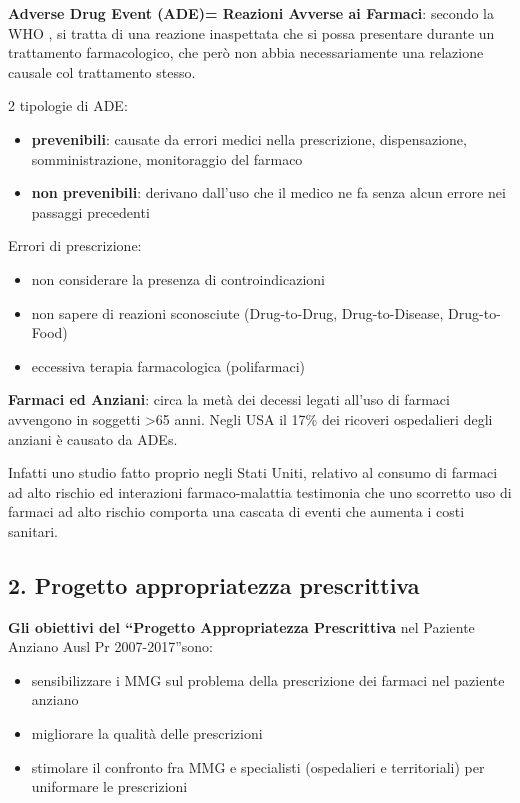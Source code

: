   \textbf{Adverse Drug Event (ADE)= Reazioni Avverse ai Farmaci}:
  secondo la WHO , si tratta di una reazione inaspettata che si possa
  presentare durante un trattamento farmacologico, che però non abbia
  necessariamente una relazione causale col trattamento stesso.

  2 tipologie di ADE:

\begin{itemize}
\item
  \textbf{prevenibili}: causate da errori medici nella prescrizione,
  dispensazione, somministrazione, monitoraggio del farmaco
\item
  \textbf{non prevenibili}: derivano dall'uso che il medico ne fa senza
  alcun errore nei passaggi precedenti
\end{itemize}

  Errori di prescrizione:
  
\begin{itemize}
\item non considerare la presenza di controindicazioni
\item non sapere di reazioni sconosciute (Drug-to-Drug, Drug-to-Disease,
  Drug-to-Food)
\item eccessiva terapia farmacologica (polifarmaci)
\end{itemize}

  \textbf{Farmaci ed Anziani}: circa la metà dei decessi legati all'uso
  di farmaci avvengono in soggetti \textgreater{}65 anni. Negli USA il
  17\% dei ricoveri ospedalieri degli anziani è causato da ADEs.

  Infatti uno studio fatto proprio negli Stati Uniti, relativo al
  consumo di farmaci ad alto rischio ed interazioni farmaco-malattia
  testimonia che uno scorretto uso di farmaci ad alto rischio comporta
  una cascata di eventi che aumenta i costi sanitari.

  \subsection{2. Progetto appropriatezza prescrittiva}
  
  \textbf{Gli obiettivi del ``Progetto Appropriatezza Prescrittiva} nel
  Paziente Anziano Ausl Pr 2007-2017''sono:

\begin{itemize}
\item
  sensibilizzare i MMG sul problema della prescrizione dei farmaci nel
  paziente anziano
\item
  migliorare la qualità delle prescrizioni
\item
  stimolare il confronto fra MMG e specialisti (ospedalieri e
  territoriali) per uniformare le prescrizioni
\end{itemize}

